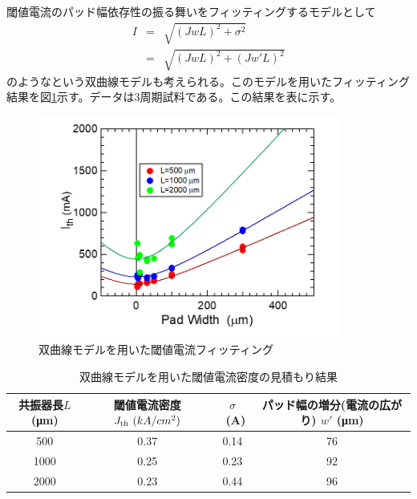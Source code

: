 閾値電流のパッド幅依存性の振る舞いをフィッティングするモデルとして
\begin{eqnarray}
I&=&\sqrt{(JwL)^2+\sigma^2}\\
&=&\sqrt{(JwL)^2+(Jw'L)^2}
\label{eq:w_prime}
\end{eqnarray}
のようなという双曲線モデルも考えられる。このモデルを用いたフィッティング結果を図\ref{fig:fig_3_1_w_prime}示す。データは3周期試料である。この結果を表に示す。


\begin{figure}[h]
	\centering
	\includegraphics[width=10cm]{figure/fig_3_1_w_prime.png}
	\caption{双曲線モデルを用いた閾値電流フィッティング}
	\label{fig:fig_3_1_w_prime}
\end{figure}

\begin{table}[h]
  \caption{双曲線モデルを用いた閾値電流密度の見積もり結果}
  \label{table:table_w_prime}
  \centering
  \begin{tabular}{cccc}
    \hline
    共振器長$L$ (\si{\micro\metre})  &  閾値電流密度 $J_{\rm{th}} \ (kA/cm^2)$ &$\sigma$\ (\si{A})& パッド幅の増分(電流の広がり)  $w'$ (\si{\micro\metre}) \\
    \hline \hline
     500 & 0.37 & 0.14 &76\\
    1000  & 0.25 & 0.23&92\\
    2000  & 0.23 & 0.44&96\\ 
    \hline
  \end{tabular}
\end{table}

\clearpage
